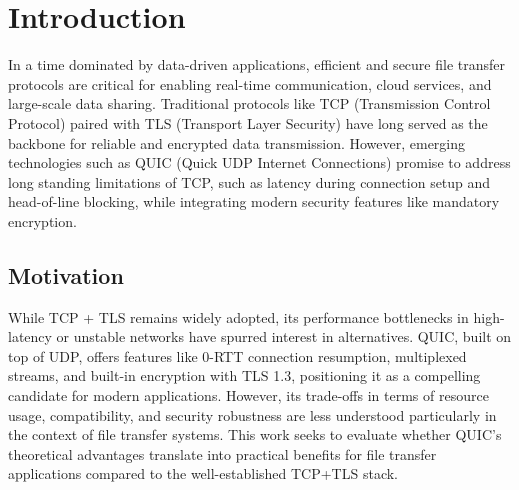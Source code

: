 \section{Introduction}
In a time dominated by data-driven applications, efficient and secure file transfer protocols are critical for enabling real-time communication, cloud services, and large-scale data sharing. Traditional protocols like TCP (Transmission Control Protocol) paired with TLS (Transport Layer Security) have long served as the backbone for reliable and encrypted data transmission. However, emerging technologies such as QUIC (Quick UDP Internet Connections) promise to address long standing limitations of TCP, such as latency during connection setup and head-of-line blocking, while integrating modern security features like mandatory encryption.

\subsection{Motivation}
While TCP + TLS remains widely adopted, its performance bottlenecks in high-latency or unstable networks have spurred interest in alternatives. QUIC, built on top of UDP, offers features like 0-RTT connection resumption, multiplexed streams, and built-in encryption with TLS 1.3, positioning it as a compelling candidate for modern applications. However, its trade-offs in terms of resource usage, compatibility, and security robustness are less understood particularly in the context of file transfer systems. This work seeks to evaluate whether QUIC's theoretical advantages translate into practical benefits for file transfer applications compared to the well-established TCP+TLS stack.